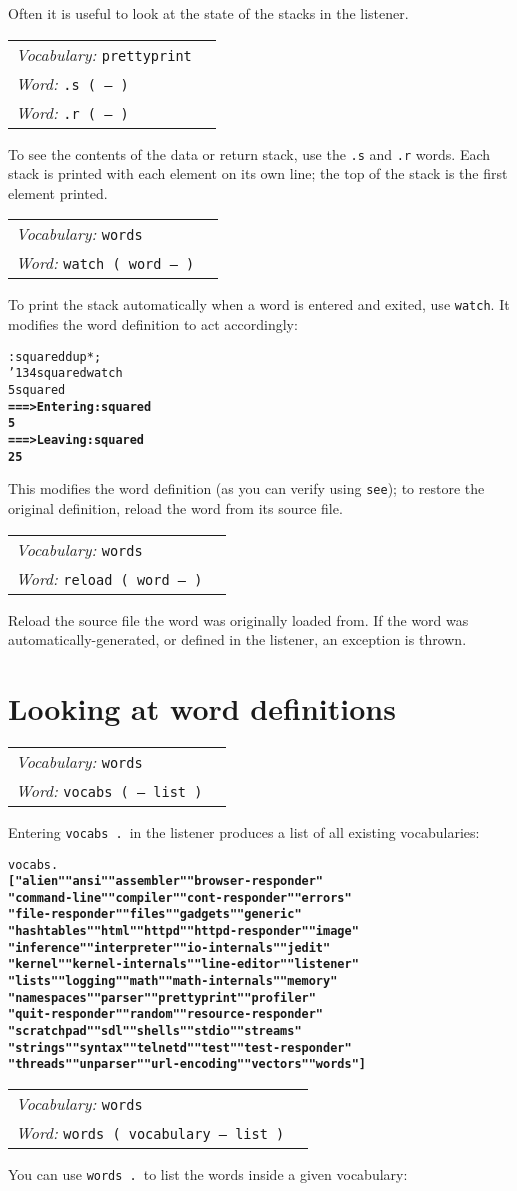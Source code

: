 \documentclass{book}
\newcommand{\bs}{\char'134}
\newcommand{\vocabulary}[1]{\emph{Vocabulary:} \texttt{#1}&\\}
\newcommand{\ordinaryword}[2]{\index{\texttt{#1}}\emph{Word:} \texttt{#2}&\\}
\newcommand{\wordtable}[1]{


\begin{tabularx}{12cm}{lX}
\hline
#1
\hline
\end{tabularx}

}
\begin{document}
Often it is useful to look at the state of the stacks in the listener.

\wordtable{
\vocabulary{prettyprint}
\ordinaryword{.s}{.s ( -- )}
\ordinaryword{.r}{.r ( -- )}
}
To see the contents of the data or return stack, use the \texttt{.s} and \texttt{.r} words.
Each stack is printed with each element on its own line; the top of the stack is the first element printed.

\wordtable{
\vocabulary{words}
\ordinaryword{watch}{watch ( word -- )}
}
To print the stack automatically when a word is entered and exited, use \verb|watch|. It modifies the word definition to act accordingly:
\begin{alltt}
  : squared dup * ;
  \bs squared watch
  5 squared
\textbf{===> Entering: squared
5 
===> Leaving:  squared
25}
\end{alltt}
This modifies the word definition (as you can verify using \verb|see|); to restore the original definition, reload the word from its source file.

\wordtable{
\vocabulary{words}
\ordinaryword{reload}{reload ( word -- )}
}
Reload the source file the word was originally loaded from. If the word was automatically-generated, or defined in the listener, an exception is thrown.

\section{Looking at word definitions}

\wordtable{
\vocabulary{words}
\ordinaryword{vocabs}{vocabs ( -- list )}
}
Entering \texttt{vocabs .}~in the listener produces a list of all existing vocabularies:

\begin{alltt}
  vocabs .
\textbf{[ "alien" "ansi" "assembler" "browser-responder"
"command-line" "compiler" "cont-responder" "errors"
"file-responder" "files" "gadgets" "generic"
"hashtables" "html" "httpd" "httpd-responder" "image"
"inference" "interpreter" "io-internals" "jedit"
"kernel" "kernel-internals" "line-editor" "listener"
"lists" "logging" "math" "math-internals" "memory"
"namespaces" "parser" "prettyprint" "profiler"
"quit-responder" "random" "resource-responder"
"scratchpad" "sdl" "shells" "stdio" "streams"
"strings" "syntax" "telnetd" "test" "test-responder"
"threads" "unparser" "url-encoding" "vectors" "words" ]}
\end{alltt}

\wordtable{
\vocabulary{words}
\ordinaryword{words}{words ( vocabulary -- list )}
}
You can use \texttt{words .}~to list the words inside a given vocabulary:
\end{document}
